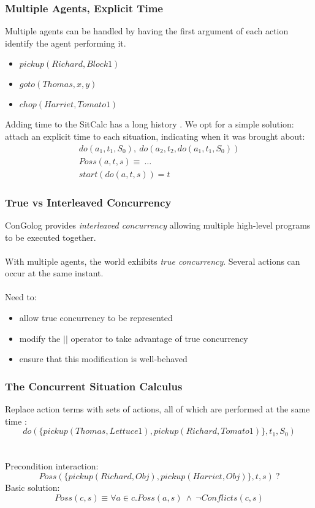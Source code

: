 \documentclass{beamer}
\begin{document}
\begin{frame}
\frametitle{Multiple Agents, Explicit Time}
Multiple agents can be handled by having the first argument of each action
identify the agent performing it.
\begin{itemize}
  \item $pickup(Richard,Block1)$
  \item $goto(Thomas,x,y)$
  \item $chop(Harriet,Tomato1)$
\end{itemize}
\pause
Adding time to the SitCalc has a long history \cite{reiter01kia}.
We opt for a simple solution: attach an explicit time to each situation,
indicating when it was brought about:\[
\begin{array}{c}
do(a_1,t_1,S_0),\ do(a_2,t_2,do(a_1,t_1,S_0))\\
Poss(a,t,s) \equiv\ \dots\\
start(do(a,t,s)) = t
\end{array}\]
\end{frame}

\begin{frame}
\frametitle{True vs Interleaved Concurrency}
ConGolog provides \emph{interleaved concurrency} allowing multiple
high-level programs to be executed together.\\
\ \\
With multiple agents, the world exhibits \emph{true concurrency}. Several
actions can occur at the same instant.\\
\ \\
\pause
Need to:
\begin{itemize}
  \item allow true concurrency to be represented
  \item modify the $||$ operator to take advantage of true concurrency
  \item ensure that this modification is well-behaved
\end{itemize}
\end{frame}

\begin{frame}
\frametitle{The Concurrent Situation Calculus}
Replace action terms with sets of actions, all of which are performed
at the same time \cite{reiter01kia}:\[
do(\{pickup(Thomas,Lettuce1),pickup(Richard,Tomato1)\},t_1,S_0)\]
\pause
\ \\
\ \\
Precondition interaction:\[
Poss(\{pickup(Richard,Obj),pickup(Harriet,Obj)\},t,s)\ ?\]
\pause
Basic solution:\[
Poss(c,s) \equiv \forall a \in c.Poss(a,s)\ \wedge\ \neg Conflicts(c,s)\]
\end{frame}
\end{document}
